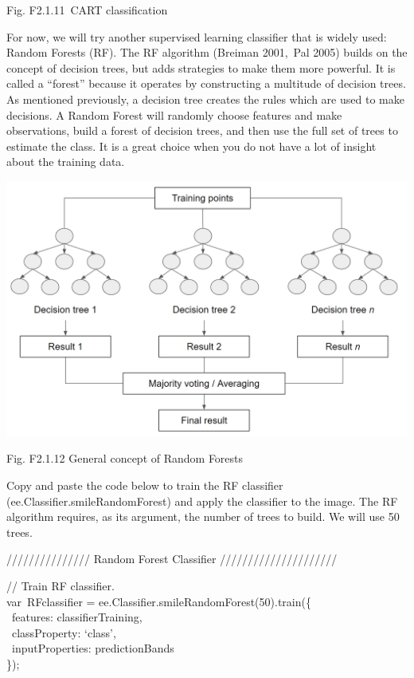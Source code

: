 \documentclass[
  letterpaper,
  DIV=11,
  numbers=noendperiod]{scrreprt}
\begin{document}
Fig. F2.1.11~CART classification

For now, we will try another supervised learning classifier that is
widely used: Random Forests (RF). The RF algorithm (Breiman 2001,~Pal
2005) builds on the concept of decision trees, but adds strategies to
make them more powerful. It is called a ``forest'' because it operates
by constructing a multitude of decision trees. As mentioned previously,
a decision tree creates the rules which are used to make decisions. A
Random Forest will randomly choose features and make observations, build
a forest of decision trees, and then use the full set of trees to
estimate the class. It is a great choice when you do not have a lot of
insight about the training data.

\includegraphics{./F2/image27.png}

Fig. F2.1.12 General concept of Random Forests

Copy and paste the code below to train the RF classifier
(ee.Classifier.smileRandomForest) and apply the classifier to the image.
The RF algorithm requires, as its argument, the number of trees to
build. We will use 50 trees.

/////////////// Random Forest Classifier /////////////////////

// Train RF classifier.\\
var~RFclassifier = ee.Classifier.smileRandomForest(50).train(\{\\
\hspace*{0.333em} ~features: classifierTraining,\\
\hspace*{0.333em} ~classProperty: `class',\\
\hspace*{0.333em} ~inputProperties: predictionBands\\
\});
\end{document}
